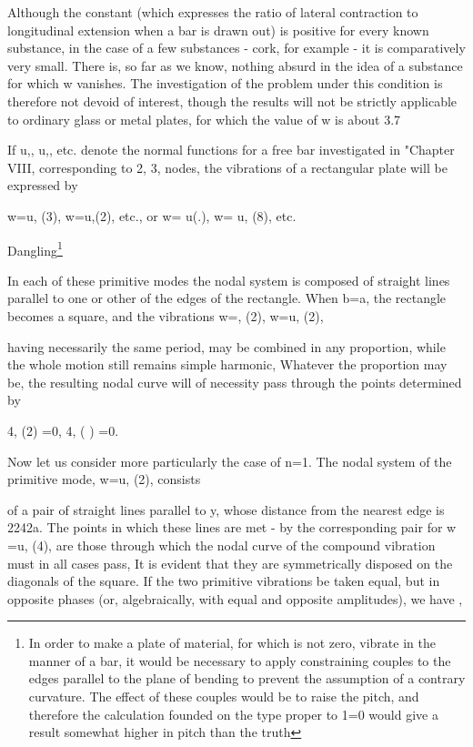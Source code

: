Although the constant (which expresses the ratio of lateral contraction
to longitudinal extension when a bar is drawn out) is positive for every
known substance, in the case of a few substances - cork, for example - it
is comparatively very small. There is, so far as we know, nothing absurd
in the idea of a substance for which w vanishes. The investigation of
the problem under this condition is therefore not devoid of interest,
though the results will not be strictly applicable to ordinary glass or
metal plates, for which the value of w is about 3.7

If u,, u,, etc. denote the normal functions for a free bar investigated
in "Chapter VIII, corresponding to 2, 3, nodes, the vibrations of
a rectangular plate will be expressed by

w=u, (3), w=u,(2), etc., or w= u(.), w= u, (8), etc.

Dangling\footnote{ In order to make a plate of material, for which is not zero, vibrate
in the manner of a bar, it would be necessary to apply constraining
couples to the edges parallel to the plane of bending to prevent the
assumption of a contrary curvature. The effect of these couples would be
to raise the pitch, and therefore the calculation founded on the type
proper to 1=0 would give a result somewhat higher in pitch than the
truth}

In each of these primitive modes the nodal system is composed of
straight lines parallel to one or other of the edges of the rectangle.
When b=a, the rectangle becomes a square, and the vibrations w=, (2),
w=u, (2),

having necessarily the same period, may be combined in any proportion,
while the whole motion still remains simple harmonic, Whatever the
proportion may be, the resulting nodal curve will of necessity pass
through the points determined by

4, (2) =0, 4, ( ) =0.

Now let us consider more particularly the case of n=1. The nodal system
of the primitive mode, w=u, (2), consists

of a pair of straight lines parallel to y, whose distance from the
nearest edge is 2242a. The points in which these lines are met - by the
corresponding pair for w =u, (4), are those through which the nodal
curve of the compound vibration must in all cases pass, It is evident
that they are symmetrically disposed on the diagonals of the square. If
the two primitive vibrations be taken equal, but in opposite phases
(or, algebraically, with equal and opposite amplitudes), we have ,

